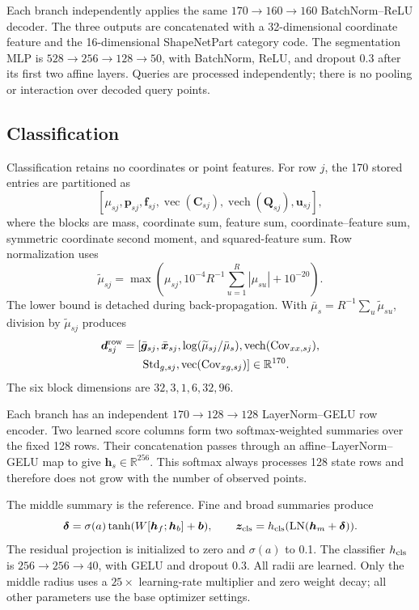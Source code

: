 \documentclass[review,12pt,authoryear]{elsarticle}
\newcommand{\R}{\mathbb{R}}
\newcommand{\vect}{\operatorname{vec}}
\begin{document}
Each branch independently applies the same \(170\rightarrow160\rightarrow160\) BatchNorm--ReLU decoder. The three outputs are concatenated with a 32-dimensional coordinate feature and the 16-dimensional ShapeNetPart category code. The segmentation MLP is \(528\rightarrow256\rightarrow128\rightarrow50\), with BatchNorm, ReLU, and dropout 0.3 after its first two affine layers. Queries are processed independently; there is no pooling or interaction over decoded query points.

\subsection{Classification}

Classification retains no coordinates or point features. For row \(j\), the 170 stored entries are partitioned as
\[
[\mu_{sj},\bm p_{sj},\bm f_{sj},\vect(\bm C_{sj}),
\operatorname{vech}(\bm Q_{sj}),\bm u_{sj}],
\]
where the blocks are mass, coordinate sum, feature sum, coordinate--feature sum, symmetric coordinate second moment, and squared-feature sum. Row normalization uses
\begin{equation}
\widetilde\mu_{sj}=\max\!\left(
\mu_{sj},10^{-4}R^{-1}\sum_{u=1}^{R}|\mu_{su}|+10^{-20}\right).
\label{eq:cls-floor}
\end{equation}
The lower bound is detached during back-propagation. With \(\bar\mu_s=R^{-1}\sum_u\widetilde\mu_{su}\), division by \(\widetilde\mu_{sj}\) produces
\begin{equation}
\begin{aligned}
\bm d^{\rm row}_{sj}=[&
\bar{\bm g}_{sj},\bar{\bm x}_{sj},
\log(\widetilde\mu_{sj}/\bar\mu_s),
\operatorname{vech}(\operatorname{Cov}_{xx,sj}),\\
&\operatorname{Std}_{g,sj},
\vect(\operatorname{Cov}_{xg,sj})]\in\R^{170}.
\end{aligned}
\label{eq:cls-descriptor}
\end{equation}
The six block dimensions are \(32,3,1,6,32,96\).

Each branch has an independent \(170\rightarrow128\rightarrow128\) LayerNorm--GELU row encoder. Two learned score columns form two softmax-weighted summaries over the fixed 128 rows. Their concatenation passes through an affine--LayerNorm--GELU map to give \(\bm h_s\in\R^{256}\). This softmax always processes 128 state rows and therefore does not grow with the number of observed points.

The middle summary is the reference. Fine and broad summaries produce
\[
\bm\delta=\sigma(a)\tanh(W[\bm h_f;\bm h_b]+\bm b),\qquad
\bm z_{\rm cls}=h_{\rm cls}(\operatorname{LN}(\bm h_m+\bm\delta)).
\]
The residual projection is initialized to zero and \(\sigma(a)\) to 0.1. The classifier \(h_{\rm cls}\) is \(256\rightarrow256\rightarrow40\), with GELU and dropout 0.3. All radii are learned. Only the middle radius uses a \(25\times\) learning-rate multiplier and zero weight decay; all other parameters use the base optimizer settings.
\end{document}
